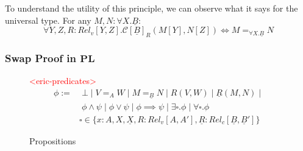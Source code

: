 \documentclass[acmsmall]{acmart}
\newcommand{\eric}[1]{\textcolor{red}{ <eric-#1> }}
\newcommand{\pl}{$\mathbf{PL}$}
\begin{document}
To understand the utility of this principle, we can observe what it says for the universal type. For any $M,N : \forall X.\underline{B}$:
\[
  \forall Y,Z,R:Rel_v[Y,Z].\mathcal{C}[\underline{B}]_R(M[Y],N[Z]) \iff M =_{\forall X. \underline{B}} N
\]


\subsubsection{Swap Proof in \pl}


\begin{figure}[h]
  \centering
  \eric{predicates}
  \scriptsize
  \begin{align*}
    \phi :=&\; \bot\;|\;V=_{A}W \;|\; M=_{\underline{B}}N \;|\; R(V,W) \;|\; \underline{R}(M,N) \;|\; 
    \\
    &\; \phi \land \psi \;|\; \phi \lor \psi \;|\; \phi \implies \psi \;|\; \exists \square.\phi \;|\; \forall \square .\phi \\ 
    & \square \in \{x:A,X,\underline{X},R:Rel_v[A,A'],\underline{R}:Rel_c[\underline{B},\underline{B}']\}
    \end{align*}
  \caption{Propositions}
  \label{fig:Props}
\end{figure}
\end{document}
